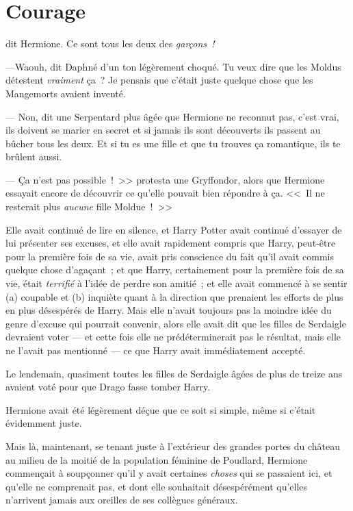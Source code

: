 \chapter{Courage}

 dit Hermione. Ce sont tous les deux des \emph{garçons~!}

\hplettrineextrapara
---Waouh, dit Daphné d'un ton légèrement choqué. Tu veux dire que les Moldus détestent \emph{vraiment} ça~? Je pensais que c'était juste quelque chose que les Mangemorts avaient inventé.

--- Non, dit une Serpentard plus âgée que Hermione ne reconnut pas, c'est vrai, ils doivent se marier en secret et si jamais ils sont découverts ils passent au bûcher tous les deux. Et si tu es une fille et que tu trouves ça romantique, ils te brûlent aussi.

--- Ça n'est pas possible~!~>> protesta une Gryffondor, alors que Hermione essayait encore de découvrir ce qu'elle pouvait bien répondre à ça. <<~Il ne resterait plus \emph{aucune} fille Moldue~!~>>

Elle avait continué de lire en silence, et Harry Potter avait continué d'essayer de lui présenter ses excuses, et elle avait rapidement compris que Harry, peut-être pour la première fois de sa vie, avait pris conscience du fait qu'il avait commis quelque chose d'agaçant~; et que Harry, certainement pour la première fois de sa vie, était \emph{terrifié} à l'idée de perdre son amitié~; et elle avait commencé à se sentir (a) coupable et (b) inquiète quant à la direction que prenaient les efforts de plus en plus désespérés de Harry. Mais elle n'avait toujours pas la moindre idée du genre d'excuse qui pourrait convenir, alors elle avait dit que les filles de Serdaigle devraient voter — et cette fois elle ne prédéterminerait pas le résultat, mais elle ne l'avait pas mentionné — ce que Harry avait immédiatement accepté.

Le lendemain, quasiment toutes les filles de Serdaigle âgées de plus de treize ans avaient voté pour que Drago fasse tomber Harry.

Hermione avait été légèrement déçue que ce soit si simple, même si c'était évidemment juste.

Mais là, maintenant, se tenant juste à l'extérieur des grandes portes du château au milieu de la moitié de la population féminine de Poudlard, Hermione commençait à soupçonner qu'il y avait certaines \emph{choses} qui se passaient ici, et qu'elle ne comprenait pas, et dont elle souhaitait désespérément qu'elles n'arrivent jamais aux oreilles de ses collègues généraux.

